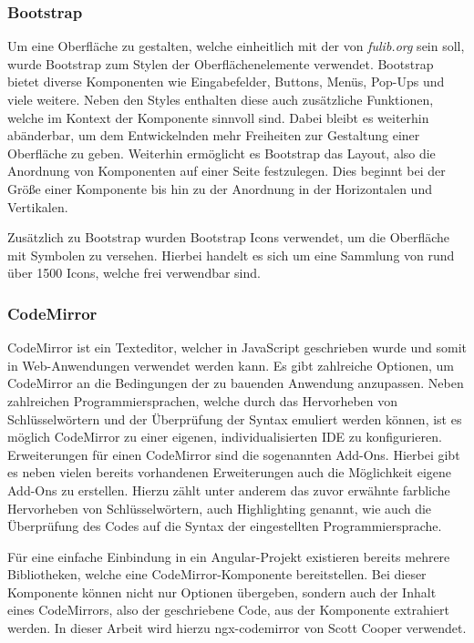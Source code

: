 \subsubsection{Bootstrap}
Um eine Oberfläche zu gestalten, welche einheitlich mit der von \textit{fulib.org} sein soll, wurde Bootstrap zum
Stylen der Oberflächenelemente verwendet.
Bootstrap bietet diverse Komponenten wie Eingabefelder, Buttons, Menüs, Pop-Ups und viele weitere.
Neben den Styles enthalten diese auch zusätzliche Funktionen, welche im Kontext der Komponente sinnvoll sind.
Dabei bleibt es weiterhin abänderbar, um dem Entwickelnden mehr Freiheiten zur Gestaltung einer Oberfläche zu geben.
Weiterhin ermöglicht es Bootstrap das Layout, also die Anordnung von Komponenten auf einer Seite festzulegen.
Dies beginnt bei der Größe einer Komponente bis hin zu der Anordnung in der Horizontalen und Vertikalen\cite*{bs}.

Zusätzlich zu Bootstrap wurden Bootstrap Icons verwendet, um die Oberfläche mit Symbolen zu versehen.
Hierbei handelt es sich um eine Sammlung von rund über 1500 Icons, welche frei verwendbar sind\cite*{bsIcons}.

\subsubsection{CodeMirror}
CodeMirror ist ein Texteditor, welcher in JavaScript geschrieben wurde und somit in Web-Anwendungen verwendet werden kann.
Es gibt zahlreiche Optionen, um CodeMirror an die Bedingungen der zu bauenden Anwendung anzupassen.
Neben zahlreichen Programmiersprachen, welche durch das Hervorheben von Schlüsselwörtern und der Überprüfung der Syntax emuliert werden können,
ist es möglich CodeMirror zu einer eigenen, individualisierten \ac{IDE} zu konfigurieren.
Erweiterungen für einen CodeMirror sind die sogenannten Add-Ons.
Hierbei gibt es neben vielen bereits vorhandenen Erweiterungen auch die Möglichkeit eigene Add-Ons zu erstellen.
Hierzu zählt unter anderem das zuvor erwähnte farbliche Hervorheben von Schlüsselwörtern, auch Highlighting genannt, wie auch die
Überprüfung des Codes auf die Syntax der eingestellten Programmiersprache\cite*{cm}.

Für eine einfache Einbindung in ein Angular-Projekt existieren bereits mehrere Bibliotheken, welche eine CodeMirror-Komponente bereitstellen.
Bei dieser Komponente können nicht nur Optionen übergeben, sondern auch der Inhalt eines CodeMirrors, also der geschriebene Code, aus der Komponente
extrahiert werden.
In dieser Arbeit wird hierzu ngx-codemirror von Scott Cooper verwendet\cite*{ngxcm}.
